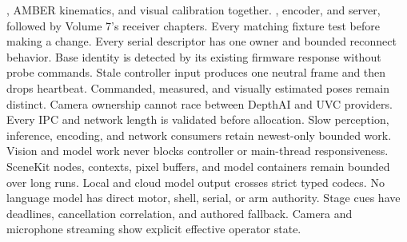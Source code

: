 , AMBER kinematics, and visual calibration together.\markdownRendererOlItemEnd 
{}, encoder, and server, followed by Volume 7's receiver chapters.\markdownRendererOlItemEnd 
{}Every matching fixture test before making a change.\markdownRendererOlItemEnd 
\markdownRendererOlEnd \markdownRendererInterblockSeparator
{}
\markdownRendererSectionEnd \markdownRendererSectionBegin
{}\markdownRendererInterblockSeparator
{}\markdownRendererUlBegin
\markdownRendererUlItem \markdownRendererUntickedBox{} Every serial descriptor has one owner and bounded reconnect behavior.\markdownRendererUlItemEnd 
\markdownRendererUlItem \markdownRendererUntickedBox{} Base identity is detected by its existing firmware response without probe commands.\markdownRendererUlItemEnd 
\markdownRendererUlItem \markdownRendererUntickedBox{} Stale controller input produces one neutral frame and then drops heartbeat.\markdownRendererUlItemEnd 
\markdownRendererUlItem \markdownRendererUntickedBox{} Commanded, measured, and visually estimated poses remain distinct.\markdownRendererUlItemEnd 
\markdownRendererUlItem \markdownRendererUntickedBox{} Camera ownership cannot race between DepthAI and UVC providers.\markdownRendererUlItemEnd 
\markdownRendererUlItem \markdownRendererUntickedBox{} Every IPC and network length is validated before allocation.\markdownRendererUlItemEnd 
\markdownRendererUlItem \markdownRendererUntickedBox{} Slow perception, inference, encoding, and network consumers retain newest-only bounded work.\markdownRendererUlItemEnd 
\markdownRendererUlItem \markdownRendererUntickedBox{} Vision and model work never blocks controller or main-thread responsiveness.\markdownRendererUlItemEnd 
\markdownRendererUlItem \markdownRendererUntickedBox{} SceneKit nodes, contexts, pixel buffers, and model containers remain bounded over long runs.\markdownRendererUlItemEnd 
\markdownRendererUlItem \markdownRendererUntickedBox{} Local and cloud model output crosses strict typed codecs.\markdownRendererUlItemEnd 
\markdownRendererUlItem \markdownRendererUntickedBox{} No language model has direct motor, shell, serial, or arm authority.\markdownRendererUlItemEnd 
\markdownRendererUlItem \markdownRendererUntickedBox{} Stage cues have deadlines, cancellation correlation, and authored fallback.\markdownRendererUlItemEnd 
\markdownRendererUlItem \markdownRendererUntickedBox{} Camera and microphone streaming show explicit effective operator state.\markdownRendererUlItemEnd 
